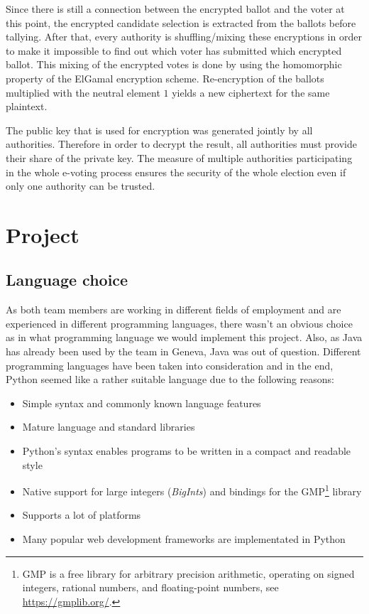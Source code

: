 \documentclass[a4paper,12pt]{report}
\begin{document}
Since there is still a connection between the encrypted ballot and the voter at this point, the encrypted candidate selection is extracted from the ballots before tallying. After that, every authority is shuffling/mixing these encryptions in order to make it impossible to find out which voter has submitted which encrypted ballot. This mixing of the encrypted votes is done by using the homomorphic property of the ElGamal encryption scheme. Re-encryption of the ballots multiplied with the neutral element $1$ yields a new ciphertext for the same plaintext.

The public key that is used for encryption was generated jointly by all authorities. Therefore in order to decrypt the result, all authorities must provide their share of the private key. The measure of multiple authorities participating in the whole e-voting process ensures the security of the whole election even if only one authority can be trusted.

\chapter{Project}
\section{Language choice}
As both team members are working in different fields of employment and are experienced in different programming languages, there wasn't an obvious choice as in what programming language we would implement this project. Also, as Java has already been used by the team in Geneva, Java was out of question. Different programming languages have been taken into consideration and in the end, Python seemed like a rather suitable language due to the following reasons:

\begin{itemize}
	\item Simple syntax and commonly known language features
	\item Mature language and standard libraries
	\item Python's syntax enables programs to be written in a compact and readable style
	\item Native support for large integers (\textit{BigInts}) and bindings for the GMP\footnote{GMP is a free library for arbitrary precision arithmetic, operating on signed integers, rational numbers, and floating-point numbers, see \url{https://gmplib.org/}.} library
	\item Supports a lot of platforms
	\item Many popular web development frameworks are implementated in Python
\end{itemize}
\end{document}
